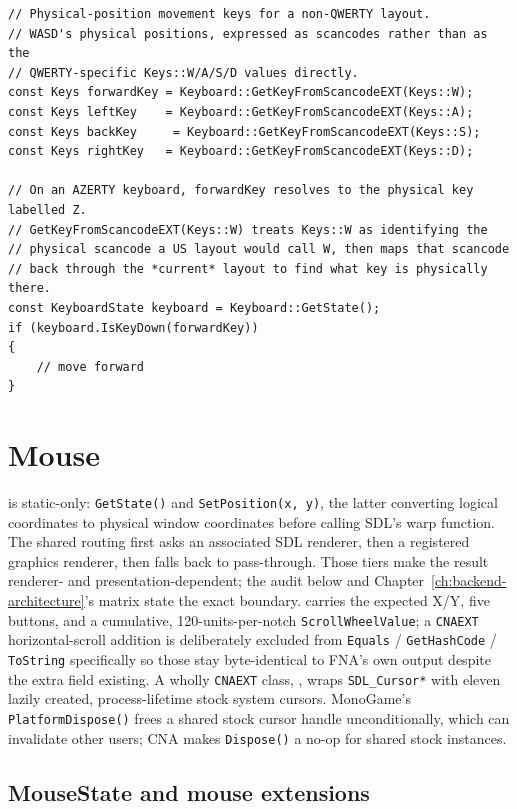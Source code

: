 \begin{lstlisting}
// Physical-position movement keys for a non-QWERTY layout.
// WASD's physical positions, expressed as scancodes rather than as the
// QWERTY-specific Keys::W/A/S/D values directly.
const Keys forwardKey = Keyboard::GetKeyFromScancodeEXT(Keys::W);
const Keys leftKey    = Keyboard::GetKeyFromScancodeEXT(Keys::A);
const Keys backKey     = Keyboard::GetKeyFromScancodeEXT(Keys::S);
const Keys rightKey   = Keyboard::GetKeyFromScancodeEXT(Keys::D);

// On an AZERTY keyboard, forwardKey resolves to the physical key labelled Z.
// GetKeyFromScancodeEXT(Keys::W) treats Keys::W as identifying the
// physical scancode a US layout would call W, then maps that scancode
// back through the *current* layout to find what key is physically there.
const KeyboardState keyboard = Keyboard::GetState();
if (keyboard.IsKeyDown(forwardKey))
{
    // move forward
}
\end{lstlisting}

\section{Mouse}

 is static-only: \texttt{GetState()} and \texttt{SetPosition(x, y)}, the
latter converting logical coordinates to physical window coordinates before calling
SDL's warp function. The shared routing first asks an associated SDL renderer, then a
registered graphics renderer, then falls back to pass-through. Those tiers make the result
renderer- and presentation-dependent; the audit below and
Chapter~\ref{ch:backend-architecture}'s matrix state the exact boundary.
 carries the expected X/Y, five buttons, and a cumulative,
120-units-per-notch \texttt{ScrollWheelValue}; a \texttt{CNAEXT} horizontal-scroll addition is
deliberately excluded from \texttt{Equals} / \texttt{GetHashCode} / \texttt{ToString} specifically
so those stay byte-identical to FNA's own output despite the extra field existing. A wholly
\texttt{CNAEXT} class, , wraps \texttt{SDL\_Cursor*} with eleven lazily
created, process-lifetime stock system cursors. MonoGame's
\texttt{PlatformDispose()} frees a shared stock cursor handle unconditionally, which can
invalidate other users; CNA makes \texttt{Dispose()} a no-op for shared stock instances.

\subsection{MouseState and mouse extensions}

